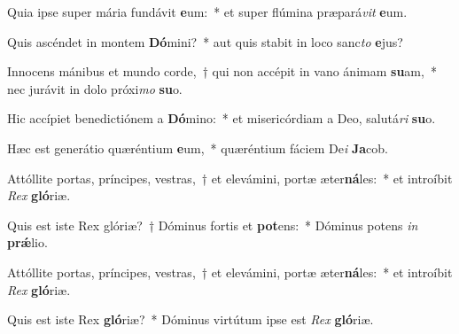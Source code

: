 \item Quia ipse super mária fundávit \textbf{e}um:~* et super flúmina præpará\textit{vit} \textbf{e}um.
\item Quis ascéndet in montem \textbf{Dó}mini?~* aut quis stabit in loco sanc\textit{to} \textbf{e}jus?
\item Innocens mánibus et mundo corde,~† qui non accépit in vano ánimam \textbf{su}am,~* nec jurávit in dolo próxi\textit{mo} \textbf{su}o.
\item Hic accípiet benedictiónem a \textbf{Dó}mino:~* et misericórdiam a Deo, salutá\textit{ri} \textbf{su}o.
\item Hæc est generátio quæréntium \textbf{e}um,~* quæréntium fáciem De\textit{i} \textbf{Ja}cob.
\item Attóllite portas, príncipes, vestras,~† et elevámini, portæ æter\textbf{ná}les:~* et introíbit \textit{Rex} \textbf{gló}riæ.
\item Quis est iste Rex glóriæ?~† Dóminus fortis et \textbf{pot}ens:~* Dóminus potens \textit{in} \textbf{prǽ}lio.
\item Attóllite portas, príncipes, vestras,~† et elevámini, portæ æter\textbf{ná}les:~* et introíbit \textit{Rex} \textbf{gló}riæ.
\item Quis est iste Rex \textbf{gló}riæ?~* Dóminus virtútum ipse est \textit{Rex} \textbf{gló}riæ.
